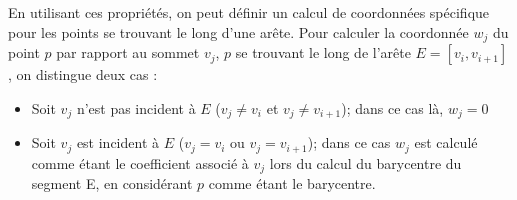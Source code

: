 En utilisant ces propriétés, on peut définir un calcul de coordonnées spécifique
pour les points se trouvant le long d'une arête. Pour calculer la coordonnée
$w_j$ du point $p$ par rapport au sommet $v_j$, $p$ se trouvant le long de
l'arête $E = [v_i,v_{i+1}]$, on distingue deux cas :

\begin{itemize}
\item Soit $v_j$ n'est pas incident à $E$ ($v_j \neq v_i$ et $v_j \neq
v_{i+1}$); dans ce cas là, $w_j = 0$
\item Soit $v_j$ est incident à $E$ ($v_j = v_i$ ou $v_j = v_{i+1}$); dans ce
cas $w_j$ est calculé comme étant le coefficient associé à $v_j$ lors du calcul
du barycentre du segment E, en considérant $p$ comme étant le barycentre.
\end{itemize}